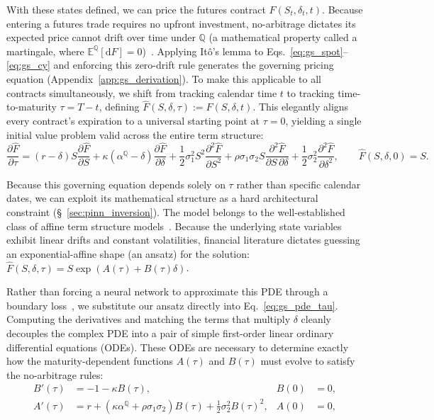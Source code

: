 \documentclass[11pt, a4paper]{article}
\newcommand{\convyield}{\delta}             %
\newcommand{\meanrev}{\kappa}               %
\newcommand{\longrun}{\alpha}               %
\begin{document}
With these states defined, we can price the futures contract $F(S_t, \convyield_t, t)$. Because entering a futures trade requires no upfront investment, no-arbitrage dictates its expected price cannot drift over time under $\mathbb{Q}$ (a mathematical property called a martingale, where $\mathbb{E}^{\mathbb{Q}}[\mathrm{d}F] = 0$)~\cite{harrison1981martingales}. Applying It\^{o}'s lemma to Eqs.~\ref{eq:gs_spot}--\ref{eq:gs_cy} and enforcing this zero-drift rule generates the governing pricing equation (Appendix~\ref{app:gs_derivation}). To make this applicable to all contracts simultaneously, we shift from tracking calendar time $t$ to tracking time-to-maturity $\tau = T - t$, defining $\hat{F}(S, \convyield, \tau) := F(S, \convyield, t)$. This elegantly aligns every contract's expiration to a universal starting point at $\tau = 0$, yielding a single initial value problem valid across the entire term structure:
\begin{equation}
  \label{eq:gs_pde_tau}
  \frac{\partial \hat{F}}{\partial \tau} = (r - \convyield)S\frac{\partial \hat{F}}{\partial S}
  + \meanrev(\longrun^{\mathbb{Q}} - \convyield)\frac{\partial \hat{F}}{\partial \convyield}
  + \frac{1}{2}\sigma_1^2 S^2 \frac{\partial^2 \hat{F}}{\partial S^2}
  + \rho\sigma_1\sigma_2 S \frac{\partial^2 \hat{F}}{\partial S\,\partial \convyield}
  + \frac{1}{2}\sigma_2^2 \frac{\partial^2 \hat{F}}{\partial \convyield^2},
  \qquad \hat{F}(S, \convyield, 0) = S.
\end{equation}

Because this governing equation depends solely on $\tau$ rather than specific calendar dates, we can exploit its mathematical structure as a hard architectural constraint (\S~\ref{sec:pinn_inversion}). The model belongs to the well-established class of affine term structure models~\cite{duffie2000transform}. Because the underlying state variables exhibit linear drifts and constant volatilities, financial literature dictates guessing an exponential-affine shape (an ansatz) for the solution: $\hat{F}(S, \convyield, \tau) = S \exp(A(\tau) + B(\tau)\convyield)$. 

Rather than forcing a neural network to approximate this PDE through a boundary loss~\cite{Hoshisashi2024Physics-InformedPDEs}, we substitute our ansatz directly into Eq.~\ref{eq:gs_pde_tau}. Computing the derivatives and matching the terms that multiply $\convyield$ cleanly decouples the complex PDE into a pair of simple first-order linear ordinary differential equations (ODEs). These ODEs are necessary to determine exactly how the maturity-dependent functions $A(\tau)$ and $B(\tau)$ must evolve to satisfy the no-arbitrage rules:
\begin{align}
  \label{eq:gs_ode_B}
  B'(\tau) &= -1 - \kappa B(\tau), & B(0) &= 0, \\
  \label{eq:gs_ode_A}
  A'(\tau) &= r + \left(\kappa\alpha^{\mathbb{Q}} + \rho\sigma_1\sigma_2\right)B(\tau)
             + \frac{1}{2}\sigma_2^2 B(\tau)^2, & A(0) &= 0,
\end{align}
\end{document}
